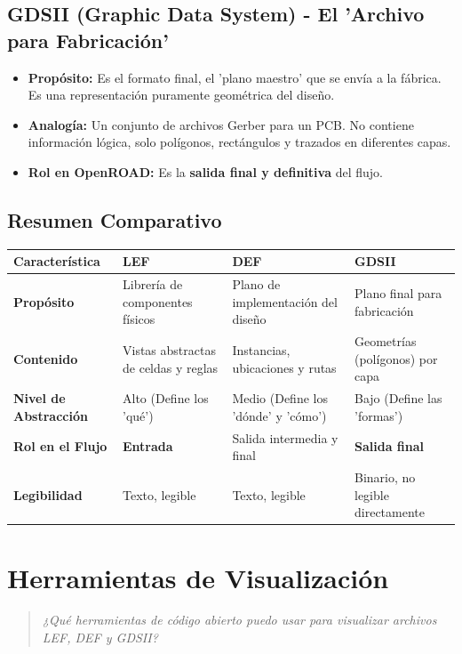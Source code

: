 \documentclass[12pt,a4paper]{article}
\newenvironment{pregunta}
  {\begin{leftbar}\begin{quote}\itshape}
  {\end{quote}\end{leftbar}}
\begin{document}
\subsection{GDSII (Graphic Data System) - El 'Archivo para Fabricación'}
\begin{itemize}
    \item \textbf{Propósito:} Es el formato final, el 'plano maestro' que se envía a la fábrica. Es una representación puramente geométrica del diseño.
    \item \textbf{Analogía:} Un conjunto de archivos Gerber para un PCB. No contiene información lógica, solo polígonos, rectángulos y trazados en diferentes capas.
    \item \textbf{Rol en OpenROAD:} Es la \textbf{salida final y definitiva} del flujo.
\end{itemize}

\subsection{Resumen Comparativo}
\begin{center}
\begin{tabular}{|l|p{4cm}|p{4cm}|p{4cm}|}
\hline
\textbf{Característica} & \textbf{LEF} & \textbf{DEF} & \textbf{GDSII} \\
\hline
\textbf{Propósito} & Librería de componentes físicos & Plano de implementación del diseño & Plano final para fabricación \\
\hline
\textbf{Contenido} & Vistas abstractas de celdas y reglas & Instancias, ubicaciones y rutas & Geometrías (polígonos) por capa \\
\hline
\textbf{Nivel de Abstracción} & Alto (Define los 'qué') & Medio (Define los 'dónde' y 'cómo') & Bajo (Define las 'formas') \\
\hline
\textbf{Rol en el Flujo} & \textbf{Entrada} & Salida intermedia y final & \textbf{Salida final} \\
\hline
\textbf{Legibilidad} & Texto, legible & Texto, legible & Binario, no legible directamente \\
\hline
\end{tabular}
\end{center}

\newpage
\section{Herramientas de Visualización}

\begin{pregunta}
¿Qué herramientas de código abierto puedo usar para visualizar archivos LEF, DEF y GDSII?
\end{pregunta}
\end{document}
